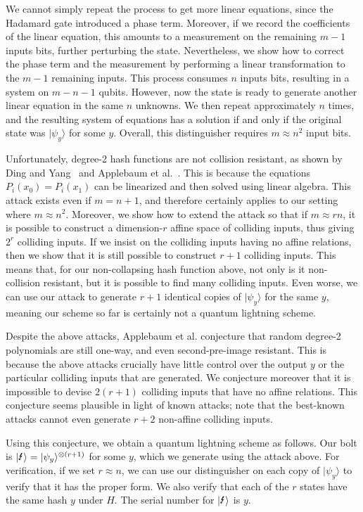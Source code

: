 We cannot simply repeat the process to get more linear equations, since the Hadamard gate introduced a phase term.  Moreover, if we record the coefficients of the linear equation, this amounts to a measurement on the remaining $m-1$ inputs bits, further perturbing the state.  Nevertheless, we show how to correct the phase term and the measurement by performing a linear transformation to the $m-1$ remaining inputs.  This process consumes $n$ inputs bits, resulting in a system on $m-n-1$ qubits.  However, now the state is ready to generate another linear equation in the same $n$ unknowns.  We then repeat approximately $n$ times, and the resulting system of equations has a solution if and only if the original state was $|\psi_y\rangle$ for some $y$.  Overall, this distinguisher requires $m\approx n^2$ input bits.  

Unfortunately, degree-2 hash functions are not collision resistant, as shown by Ding and Yang~\cite{DingYang08} and Applebaum et al.~\cite{ITCS:AHIKV17}.  This is because the equations $P_i(x_0)=P_i(x_1)$ can be linearized and then solved using linear algebra.  This attack exists even if $m=n+1$, and therefore certainly applies to our setting where $m\approx n^2$.  Moreover, we show how to extend the attack so that if $m\approx rn$, it is possible to construct a dimension-$r$ affine space of colliding inputs, thus giving $2^r$ colliding inputs.  If we insist on the colliding inputs having no affine relations, then we show that it is still possible to construct $r+1$ colliding inputs.  This means that, for our non-collapsing hash function above, not only is it non-collision resistant, but it is possible to find many colliding inputs.  Even worse, we can use our attack to generate $r+1$ identical copies of $|\psi_y\rangle$ for the same $y$, meaning our scheme so far is certainly not a quantum lightning scheme.

\smallskip

Despite the above attacks, Applebaum et al. conjecture that random degree-2 polynomials are still one-way, and even second-pre-image resistant.  This is because the above attacks crucially have little control over the output $y$ or the particular colliding inputs that are generated.  We conjecture moreover that it is impossible to devise $2(r+1)$ colliding inputs that have no affine relations.  This conjecture seems plausible in light of known attacks; note that the best-known attacks cannot even generate $r+2$ non-affine colliding inputs.  

Using this conjecture, we obtain a quantum lightning scheme as follows.  Our bolt is $\qlightning=|\psi_y\rangle^{\otimes (r+1)}$ for some $y$, which we generate using the attack above.  For verification, if we set $r\approx n$, we can use our distinguisher on each copy of $|\psi_y\rangle$ to verify that it has the proper form.  We also verify that each of the $r$ states have the same hash $y$ under $H$.  The serial number for $\qlightning$ is $y$.  

